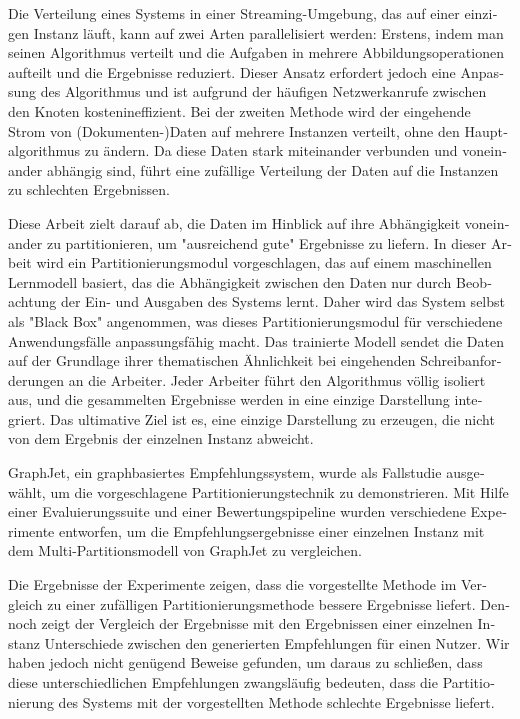 \null\vfil
\begin{otherlanguage}{ngerman}
\begin{center}\textsf{\textbf{\abstractname}}\end{center}

\noindent 
Die Verteilung eines Systems in einer Streaming-Umgebung, das auf einer einzigen Instanz läuft, kann auf zwei Arten parallelisiert werden: Erstens, indem man seinen Algorithmus verteilt und die Aufgaben in mehrere Abbildungsoperationen aufteilt und die Ergebnisse reduziert. Dieser Ansatz erfordert jedoch eine Anpassung des Algorithmus und ist aufgrund der häufigen Netzwerkanrufe zwischen den Knoten kostenineffizient. Bei der zweiten Methode wird der eingehende Strom von (Dokumenten-)Daten auf mehrere Instanzen verteilt, ohne den Hauptalgorithmus zu ändern. Da diese Daten stark miteinander verbunden und voneinander abhängig sind, führt eine zufällige Verteilung der Daten auf die Instanzen zu schlechten Ergebnissen.

Diese Arbeit zielt darauf ab, die Daten im Hinblick auf ihre Abhängigkeit voneinander zu partitionieren, um "ausreichend gute" Ergebnisse zu liefern. In dieser Arbeit wird ein Partitionierungsmodul vorgeschlagen, das auf einem maschinellen Lernmodell basiert, das die Abhängigkeit zwischen den Daten nur durch Beobachtung der Ein- und Ausgaben des Systems lernt. Daher wird das System selbst als "Black Box" angenommen, was dieses Partitionierungsmodul für verschiedene Anwendungsfälle anpassungsfähig macht. Das trainierte Modell sendet die Daten auf der Grundlage ihrer thematischen Ähnlichkeit bei eingehenden Schreibanforderungen an die Arbeiter. Jeder Arbeiter führt den Algorithmus völlig isoliert aus, und die gesammelten Ergebnisse werden in eine einzige Darstellung integriert. Das ultimative Ziel ist es, eine einzige Darstellung zu erzeugen, die nicht von dem Ergebnis der einzelnen Instanz abweicht.

GraphJet, ein graphbasiertes Empfehlungssystem, wurde als Fallstudie ausgewählt, um die vorgeschlagene Partitionierungstechnik zu demonstrieren. Mit Hilfe einer Evaluierungssuite und einer Bewertungspipeline wurden verschiedene Experimente entworfen, um die Empfehlungsergebnisse einer einzelnen Instanz mit dem Multi-Partitionsmodell von GraphJet zu vergleichen.


Die Ergebnisse der Experimente zeigen, dass die vorgestellte Methode im Vergleich zu einer zufälligen Partitionierungsmethode bessere Ergebnisse liefert. Dennoch zeigt der Vergleich der Ergebnisse mit den Ergebnissen einer einzelnen Instanz Unterschiede zwischen den generierten Empfehlungen für einen Nutzer. Wir haben jedoch nicht genügend Beweise gefunden, um daraus zu schließen, dass diese unterschiedlichen Empfehlungen zwangsläufig bedeuten, dass die Partitionierung des Systems mit der vorgestellten Methode schlechte Ergebnisse liefert.

\end{otherlanguage}
\vfil\null




